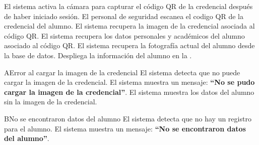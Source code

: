 \begin{UCtrayectoria}
	\UCpaso El sistema activa la cámara para capturar el código QR de la credencial  después de haber iniciado sesión.
	\UCpaso[\UCactor] El personal de seguridad escanea el codigo QR de la credencial del alumno.
	\UCpaso El sistema recupera la imagen de la credencial asociada al código QR. 
	\UCpaso El sistema recupera los datos personales y académicos del alumno asociado al código QR. 
	\UCpaso El sistema recupera la fotografía actual del alumno desde la base de datos.
	\UCpaso Despliega la información del alumno en la .
\end{UCtrayectoria}
\begin{UCtrayectoriaA}{A}{Error al cargar la imagen de la credencial}
	\UCpaso El sistema detecta que no puede cargar la imagen de la credencial.
	\UCpaso El sistema muestra un mensaje: {\bf ``No se pudo cargar la imagen de la credencial''}.
	\UCpaso El sistema muestra los datos del alumno sin la imagen de la credencial.
\end{UCtrayectoriaA}
\begin{UCtrayectoriaA}{B}{No se encontraron datos del alumno}
	\UCpaso El sistema detecta que no hay un registro para el alumno.
	\UCpaso El sistema muestra un mensaje: {\bf ``No se encontraron datos del alumno''}.

\end{UCtrayectoriaA}
